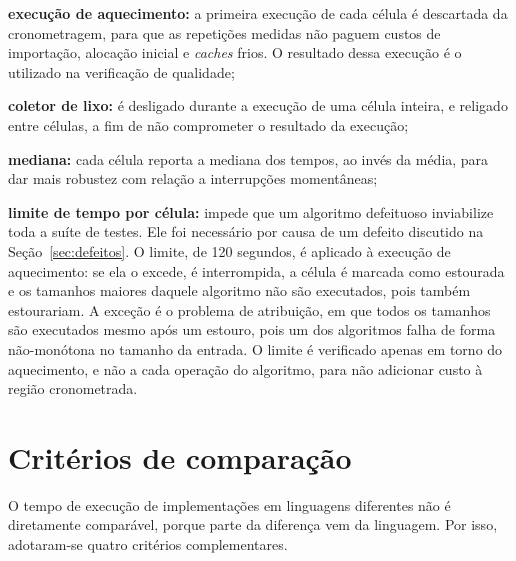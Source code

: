 \begin{alineas}
    \item \textbf{execução de aquecimento:} a primeira execução de cada célula é descartada da cronometragem, para que as repetições medidas não paguem custos de importação, alocação inicial e \textit{caches} frios. O resultado dessa execução é o utilizado na verificação de qualidade;
    \item \textbf{coletor de lixo:} é desligado durante a execução de uma célula inteira, e religado entre células, a fim de não comprometer o resultado da execução;
    \item \textbf{mediana:} cada célula reporta a mediana dos tempos, ao invés da média, para dar mais robustez com relação a interrupções momentâneas;
    \item \textbf{limite de tempo por célula:} impede que um algoritmo defeituoso inviabilize toda a suíte de testes. Ele foi necessário por causa de um defeito discutido na Seção~\ref{sec:defeitos}. O limite, de 120 segundos, é aplicado à execução de aquecimento: se ela o excede, é interrompida, a célula é marcada como estourada e os tamanhos maiores daquele algoritmo não são executados, pois também estourariam. A exceção é o problema de atribuição, em que todos os tamanhos são executados mesmo após um estouro, pois um dos algoritmos falha de forma não-monótona no tamanho da entrada. O limite é verificado apenas em torno do aquecimento, e não a cada operação do algoritmo, para não adicionar custo à região cronometrada.
\end{alineas}

\section{Critérios de comparação}
\label{sec:criterios}

O tempo de execução de implementações em linguagens diferentes não é diretamente
comparável, porque parte da diferença vem da linguagem. Por isso, adotaram-se
quatro critérios complementares.

